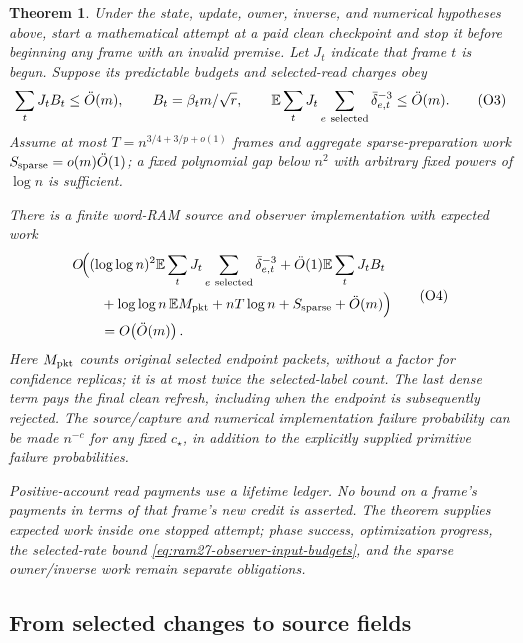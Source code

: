 \documentclass[11pt]{article}
\newtheorem{theorem}{Theorem}[section]
\theoremstyle{remark}
\newcommand{\Ex}{\mathbb E}
\renewcommand{\O}{\ddot{O}}
\begin{document}
\begin{theorem}
\label{thm:ram27-clean-observer}
Under the state, update, owner, inverse, and numerical hypotheses above, start a
mathematical attempt at a paid clean checkpoint and stop it before beginning any
frame with an invalid premise.
Let $J_t$ indicate that frame $t$ is begun.
Suppose its predictable budgets and selected-read charges obey
\[
 \sum_tJ_t B_t\le \O(m),
 \qquad B_t=\beta_t m/\sqrt r,\qquad
 \Ex\sum_tJ_t\sum_{e\ {\rm selected}}\bar\delta_{e,t}^{-3}
       \le \O(m).
                                                               \tag{O3}\label{eq:ram27-observer-input-budgets}
\]
Assume at most $T=n^{3/4+3/p+o(1)}$ frames and aggregate sparse-preparation
work $S_{\rm sparse}=o(m)\O(1)$; a fixed polynomial gap below $n^2$ with
arbitrary fixed powers of $\log n$ is sufficient.

There is a finite word-RAM source and observer implementation with expected work
\[
\begin{aligned}
 &O\!\Bigl(
     (\log\log n)^2\Ex\sum_tJ_t\sum_{e\ {\rm selected}}
                                  \bar\delta_{e,t}^{-3}
     +\O(1)\Ex\sum_tJ_t B_t\\
 &\qquad{}+\log\log n\,\Ex M_{\rm pkt}+nT\log n+S_{\rm sparse}
     +\O(m)\Bigr)\\
 &\qquad= O\!\left(\O(m)\right).
\end{aligned}                                                  \tag{O4}\label{eq:ram27-observer-attempt-work}
\]
Here $M_{\rm pkt}$ counts original selected endpoint packets, without a factor
for confidence replicas; it is at most twice the selected-label count.
The last dense term pays the final clean refresh, including when the endpoint is
subsequently rejected.
The source/capture and numerical implementation failure probability can be made
$n^{-c}$ for any fixed $c_\star$, in addition to the explicitly supplied primitive
failure probabilities.

Positive-account read payments use a lifetime ledger.
No bound on a frame's payments in terms of that frame's new credit is asserted.
The theorem supplies expected work inside one stopped attempt; phase success,
optimization progress, the selected-rate bound
\eqref{eq:ram27-observer-input-budgets}, and the sparse owner/inverse work
remain separate obligations.
\end{theorem}

\subsection{From selected changes to source fields}
\end{document}
